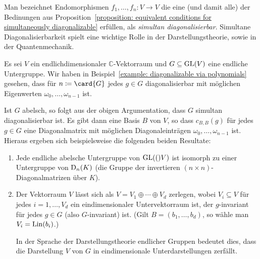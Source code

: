 Man bezeichnet Endomorphismen $f_1, \dotsc, f_n \colon V \to V$ die eine (und damit alle) der Bedinungen aus Proposition~\ref{proposition: equivalent conditions for simultaneously diagonalizable} erfüllen, als \emph{simultan diagonalisierbar}.
Simultane Diagonalisierbarkeit spielt eine wichtige Rolle in der Darstellungstheorie, sowie in der Quantenmechanik.

\begin{example}
  Es sei $V$ ein endlichdimensionaler $\mathbb{C}$-Vektorraum und $G \subseteq \operatorname{GL}(V)$ eine endliche Untergruppe.
  Wir haben in Beispiel~\ref{example: diagonalizable via polynomials} gesehen, dass für $n \defined \card{G}$ jedes $g \in G$ diagonalisierbar mit möglichen Eigenwerten $\omega_0, \dotsc, \omega_{n-1}$ ist.
  
  Ist $G$ abelsch, so folgt aus der obigen Argumentation, dass $G$ simultan diagonalisierbar ist.
  Es gibt dann eine Basis $B$ von $V$, so dass $c_{B,B}(g)$ für jedes $g \in G$ eine Diagonalmatrix mit möglichen Diagonaleinträgen $\omega_0, \dotsc, \omega_{n-1}$ ist.
  Hieraus ergeben sich beispielsweise die folgenden beiden Resultate:
  \begin{enumerate}
    \item
      Jede endliche abelsche Untergruppe von $\operatorname{GL}(()V)$ ist isomorph zu einer Untergruppe von $\operatorname{D}_{n}(K)$ (die Gruppe der invertieren $(n \times n)$-Diagonalmatrizen über $K$).
    \item
      Der Vektorraum $V$ lässt sich als $V = V_1 \oplus \dotsb \oplus V_d$ zerlegen, wobei $V_i \subseteq V$ für jedes $i = 1, \dotsc, V_d$ ein eindimensionaler Untervektorraum ist, der $g$-invariant für jedes $g \in G$ (also $G$-invariant) ist.
      (Gilt $B = (b_1, \dotsc, b_d)$, so wähle man $V_i = \operatorname{Lin}(b_i)$.)
      
      In der Sprache der Darstellungstheorie endlicher Gruppen bedeutet dies, dass die Darstellung $V$ von $G$ in eindimensionale Unterdarstellungen zerfällt.
  \end{enumerate}
\end{example}

